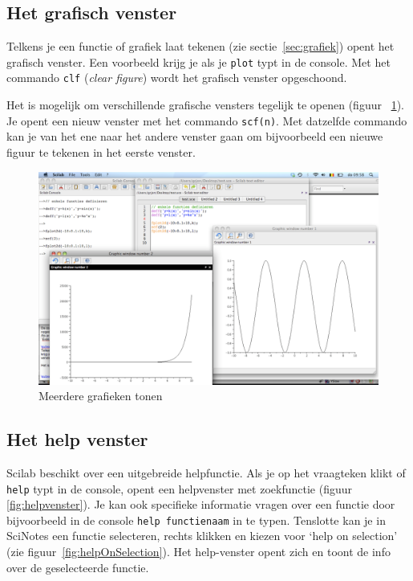 \subsection{Het grafisch venster}
Telkens je een functie of grafiek laat tekenen (zie sectie~\ref{sec:grafiek}) opent het grafisch venster. Een voorbeeld krijg je als je \verb+plot+ typt in de console.  Met het commando \verb/clf/ (\emph{clear figure}) wordt het grafisch venster opgeschoond. 

Het is mogelijk om verschillende grafische vensters tegelijk te openen (figuur ~\ref{fig:grafisch_venster}). Je opent een nieuw venster met het commando \verb+scf(n)+. Met datzelfde commando kan je van het ene naar het andere venster gaan om bijvoorbeeld een  nieuwe figuur te tekenen in het eerste venster. 
\begin{figure}[h!t]
   \begin{center}
    \includegraphics[width=\textwidth]{figuren/scilab/04grafisch_venster}
  \caption{Meerdere grafieken tonen}
	\label{fig:grafisch_venster}
	\end{center}
\end{figure}

\subsection{Het help venster}
Scilab beschikt over een uitgebreide helpfunctie. Als je op het vraagteken klikt of \verb+help+ typt in de console, opent een helpvenster met zoekfunctie (figuur \ref{fig:helpvenster}). Je kan ook specifieke informatie vragen over een functie door bijvoorbeeld in de console \verb+help functienaam+ in te typen. Tenslotte kan je in SciNotes een functie selecteren, rechts klikken en kiezen voor `help on selection' (zie figuur~\ref{fig:helpOnSelection}). Het help-venster opent zich en toont de info over de geselecteerde functie.

